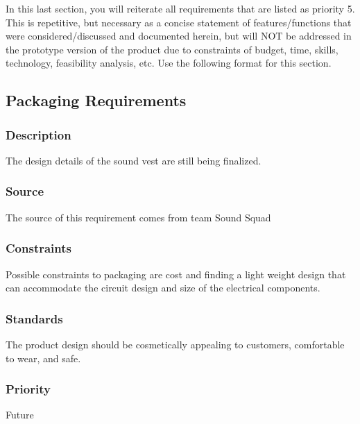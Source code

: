 In this last section, you will reiterate all requirements that are listed as priority 5. This is repetitive, but necessary as a concise statement of features/functions that were considered/discussed and documented herein, but will NOT be addressed in the prototype version of the product due to constraints of budget, time, skills, technology, feasibility analysis, etc. Use the following format for this section.

\subsection{Packaging Requirements}
\subsubsection{Description}
The design details of the sound vest are still being finalized.
\subsubsection{Source}
The source of this requirement comes from team Sound Squad
\subsubsection{Constraints}
Possible constraints to packaging are cost and finding a light weight design that can accommodate the circuit design and size of the electrical components. 
\subsubsection{Standards}
The product design should be cosmetically appealing to customers, comfortable to wear, and safe.
\subsubsection{Priority}
Future